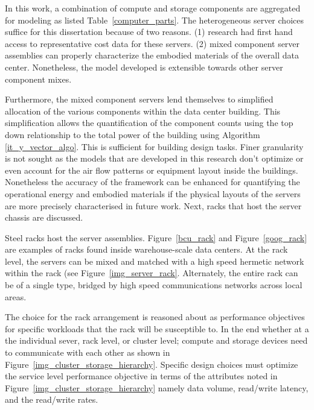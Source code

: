            
            
            In this work, a combination of compute and storage components are aggregated for modeling as listed Table~\ref{computer_parts}. The heterogeneous server choices suffice for this dissertation because of two reasons. (1) research had first hand access to representative cost data for these servers. (2) mixed component server assemblies can properly characterize the embodied materials of the overall data center. Nonetheless, the model developed is extensible towards other server component mixes. 
             
            
            Furthermore, the mixed component servers lend themselves to simplified allocation of the various components within the data center building. This simplification allows the quantification of the component counts using the top down relationship to the total power of the building using Algorithm~ \ref{it_y_vector_algo}. This is sufficient for building design tasks. Finer granularity is not sought as the models that are developed in this research don't optimize or even account for the air flow patterns or equipment layout inside the buildings. Nonetheless the accuracy of the framework can be enhanced for quantifying the operational energy and embodied materials if the physical layouts of the servers are more precisely characterised in future work. Next, racks that host the server chassis are discussed.
            
            
            Steel racks host the server assemblies. Figure~\ref{bcu_rack} and Figure~\ref{goog_rack} are examples of racks found inside warehouse-scale data centers. At the rack level, the servers can be mixed and matched with a high speed hermetic network within the rack (see Figure~\ref{img_server_rack}. Alternately, the entire rack can be of a single type, bridged by high speed communications networks across local areas. 
            
            The choice for the rack arrangement is reasoned about as performance objectives for specific workloads that the rack will be susceptible to. In the end whether at a the individual sever, rack level, or cluster level; compute and storage devices need to communicate with each other as shown in Figure~\ref{img_cluster_storage_hierarchy}. Specific design choices must optimize the service level performance objective in terms of the attributes noted in Figure~\ref{img_cluster_storage_hierarchy} namely data volume, read/write latency, and the read/write rates.
            
